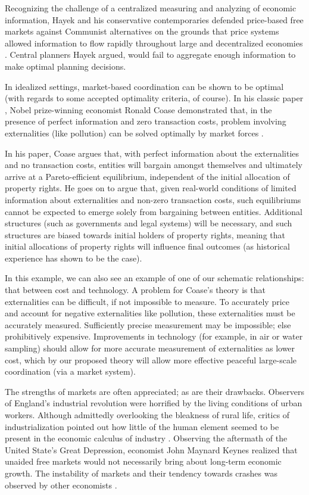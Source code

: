 Recognizing the challenge of a centralized measuring and analyzing of economic information, Hayek and his conservative contemporaries defended price-based free markets against Communist alternatives on the grounds that price systems allowed information to flow rapidly throughout large and decentralized economies \citep{hayek}.
Central planners Hayek argued, would fail to aggregate enough information to make optimal planning decisions.

\bigskip

In idealized settings, market-based coordination can be shown to be optimal (with regards to some accepted optimality criteria, of course).
In his classic paper , Nobel prize-winning economist Ronald Coase demonstrated that, in the presence of perfect information and zero transaction costs, problem involving externalities (like pollution) can be solved optimally by market forces \citep{coase}.

In his paper, Coase argues that, with perfect information about the externalities and no transaction costs, entities will bargain amongst themselves and ultimately arrive at a Pareto-efficient equilibrium, independent of the initial allocation of property rights.
He goes on to argue that, given real-world conditions of limited information about externalities and non-zero transaction costs, such equilibriums cannot be expected to emerge solely from bargaining between entities.
Additional structures (such as governments and legal systems) will be necessary, and such structures are biased towards initial holders of property rights, meaning that initial allocations of property rights will influence final outcomes (as historical experience has shown to be the case).
 
In this example, we can also see an example of one of our schematic relationships: that between cost and technology.
A problem for Coase's theory is that externalities can be difficult, if not impossible to measure.
To accurately price and account for negative externalities like pollution, these externalities must be accurately measured.
Sufficiently precise measurement may be impossible; else prohibitively expensive.
Improvements in technology (for example, in air or water sampling) should allow for more accurate measurement of externalities as lower cost, which by our proposed theory will allow more effective peaceful large-scale coordination (via a market system).

\bigskip

The strengths of markets are often appreciated; as are their drawbacks.
Observers of England's industrial revolution were horrified by the living conditions of urban workers.
Although admittedly overlooking the bleakness of rural life, critics of industrialization pointed out how little of the human element seemed to be present in the economic calculus of industry \citep{heilbroner}.
Observing the aftermath of the United State's Great Depression, economist John Maynard Keynes realized that unaided free markets would not necessarily bring about long-term economic growth.
The instability of markets and their tendency towards crashes was observed by other economists \citep{minsky}.


